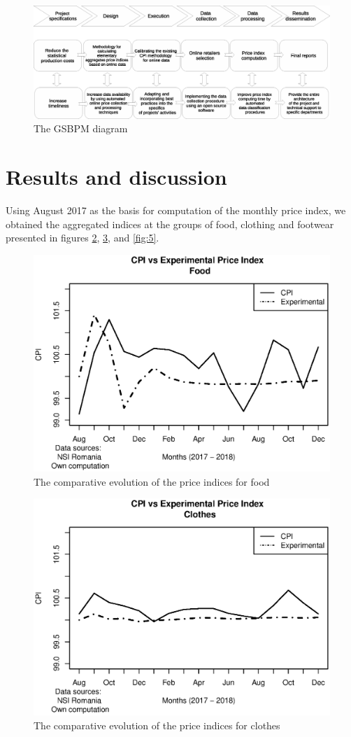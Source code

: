 \documentclass[]{article}
\begin{document}
\begin{figure}
\centering
\includegraphics[width=1\linewidth]{fig2.eps}
\caption{The GSBPM diagram}
\label{fig:2}
\end{figure}



\section{Results and discussion } \label{results}


Using August 2017 as the basis for computation of the monthly price index, we obtained the aggregated indices at the 
groups of food, clothing and footwear presented in figures \ref{fig:3}, \ref{fig:4}, and \ref{fig:5}.


\begin{figure}
\centering
\includegraphics[width=0.7\linewidth]{fig3.eps}
\caption{The comparative evolution of the price indices for food}
\label{fig:3}
\end{figure}


\begin{figure}
\centering
\includegraphics[width=0.7\linewidth]{fig4.eps}
\caption{The comparative evolution of the price indices for clothes}
\label{fig:4}
\end{figure}
\end{document}
